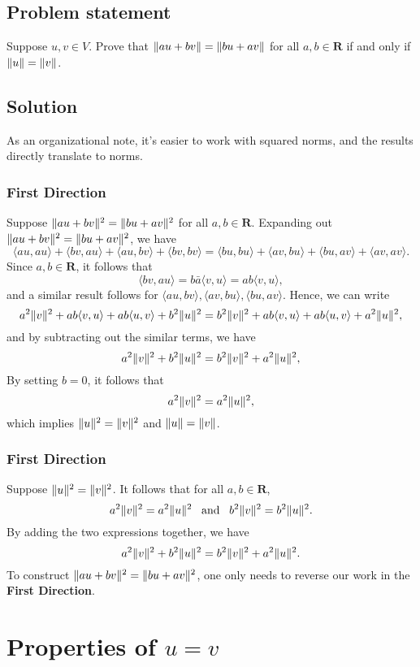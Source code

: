 \documentclass{article}
\begin{document}
\subsection*{Problem statement}
Suppose $u,v\in V$. 
Prove that $\lVert au+bv\rVert=\lVert bu+av\rVert$ for all $a,b\in \mathbf{R}$ if and only if $\lVert u\rVert=\lVert v\rVert$.

\subsection*{Solution}
As an organizational note, it's easier to work with squared norms, and the results directly translate to norms. 

\subsubsection*{First Direction}
Suppose $\lVert au+bv\rVert^2=\lVert bu+av\rVert^2$ for all $a,b\in \mathbf{R}$. 
Expanding out $\lVert au+bv\rVert^2=\lVert bu+av\rVert^2$, we have
\[\langle au,au\rangle+\langle bv,au\rangle + \langle au,bv\rangle + \langle bv,bv\rangle=\langle bu,bu\rangle+\langle av,bu\rangle + \langle bu,av\rangle + \langle av,av\rangle.\]
Since $a,b\in\mathbf{R}$, it follows that
\[\langle bv,au\rangle=b\bar{a}\langle v,u\rangle=ab\langle v,u\rangle,\]
and a similar result follows for $\langle au,bv\rangle,\langle av,bu\rangle,\langle bu,av\rangle$.
Hence, we can write
\[a^2\lVert v\rVert^2+ab\langle v,u\rangle + ab\langle u,v\rangle + b^2\lVert u\rVert^2=b^2\lVert v\rVert^2+ab\langle v,u\rangle + ab\langle u,v\rangle + a^2\lVert u\rVert^2,\]
and by subtracting out the similar terms, we have
\[a^2\lVert v\rVert^2 + b^2\lVert u\rVert^2=b^2\lVert v\rVert^2 + a^2\lVert u\rVert^2,\]
By setting $b=0$, it follows that
\[a^2\lVert v\rVert^2=a^2\lVert u\rVert^2,\]
which implies $\lVert u\rVert^2=\lVert v\rVert^2$ and $\lVert u\rVert=\lVert v\rVert$.

\subsubsection*{First Direction}
Suppose $\lVert u\rVert^2=\lVert v\rVert^2$. 
It follows that for all $a,b\in \mathbf{R}$, 
\[a^2\lVert v\rVert^2=a^2\lVert u\rVert^2 \;\;\;\text{and}\;\;\; b^2\lVert v\rVert^2=b^2\lVert u\rVert^2.\]
By adding the two expressions together, we have
\[a^2\lVert v\rVert^2 + b^2\lVert u\rVert^2=b^2\lVert v\rVert^2 + a^2\lVert u\rVert^2.\]
To construct $\lVert au+bv\rVert^2=\lVert bu+av\rVert^2$, one only needs to reverse our work in the \textbf{First Direction}.

\clearpage

\section{Properties of $u=v$}
\end{document}
